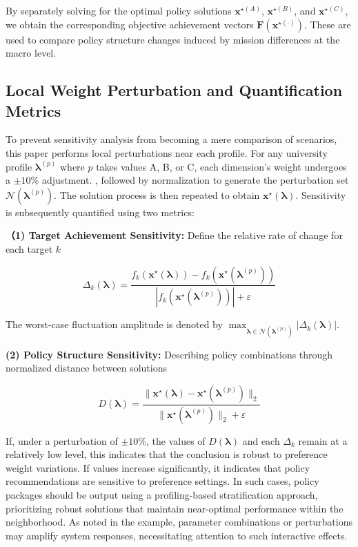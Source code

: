 \documentclass{mcmthesis}
\begin{document}
By separately solving for the optimal policy solutions $\mathbf{x}^{\star(A)}$, $\mathbf{x}^{\star(B)}$, and $\mathbf{x}^{\star(C)}$, we obtain the corresponding objective achievement vectors $\mathbf{F}(\mathbf{x}^{\star(\cdot)})$. These are used to compare policy structure changes induced by mission differences at the macro level.

\noindent\subsection{Local Weight Perturbation and Quantification Metrics}

To prevent sensitivity analysis from becoming a mere comparison of scenarios, this paper performs local perturbations near each profile. For any university profile $\boldsymbol{\lambda}^{(p)}$ where $p$ takes values A, B, or C, each dimension's weight undergoes a $\pm10\%$ adjustment. , followed by normalization to generate the perturbation set $\mathcal{N}(\boldsymbol{\lambda}^{(p)})$. The solution process is then repeated to obtain $\mathbf{x}^\star(\boldsymbol{\lambda})$. Sensitivity is subsequently quantified using two metrics:

\noindent\textbf{（1) Target Achievement Sensitivity:} Define the relative rate of change for each target $k$

\begin{equation}
\Delta_k(\boldsymbol{\lambda})=\frac{f_k(\mathbf{x}^\star(\boldsymbol{\lambda}))-f_k(\mathbf{x}^\star(\boldsymbol{\lambda}^{(p)}))}{\left|f_k(\mathbf{x}^\star(\boldsymbol{\lambda}^{(p)}))\right|+\varepsilon}
\end{equation}

The worst-case fluctuation amplitude is denoted by $\max_{\boldsymbol{\lambda}\in\mathcal{N}(\boldsymbol{\lambda}^{(p)})}|\Delta_k(\boldsymbol{\lambda})|$.

\noindent\textbf{(2) Policy Structure Sensitivity:} Describing policy combinations through normalized distance between solutions

\begin{equation} 
 D(\boldsymbol{\lambda})=\frac{\|\mathbf{x}^\star(\boldsymbol{\lambda})-\mathbf{x}^\star(\boldsymbol{\lambda}^{(p)})\|_2}{\|\mathbf{x}^\star(\boldsymbol{\lambda}^{(p)})\|_2+\varepsilon}
\end{equation}


If, under a perturbation of $\pm10\%$, the values of $D(\boldsymbol{\lambda})$ and each $\Delta_k$ remain at a relatively low level, this indicates that the conclusion is robust to preference weight variations. If values increase significantly, it indicates that policy recommendations are sensitive to preference settings. In such cases, policy packages should be output using a profiling-based stratification approach, prioritizing robust solutions that maintain near-optimal performance within the neighborhood. As noted in the example, parameter combinations or perturbations may amplify system responses, necessitating attention to such interactive effects.
\end{document}
